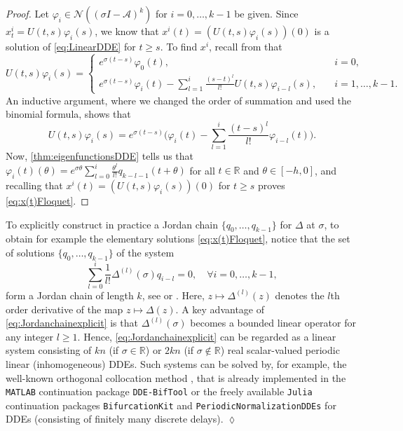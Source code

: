 \documentclass[english]{myarticle}
\begin{document}
\begin{sloppypar}
\begin{proof}
Let $\varphi_i \in \mathcal{N}((\sigma I - \mathcal{A})^k)$ for $i=0,\dots,k-1$ be given. Since $x_t^i = U(t,s)\varphi_i(s)$, we know that $x^i(t) = (U(t,s)\varphi_i(s))(0)$ is a solution of \eqref{eq:LinearDDE} for $t \geq s$. To find $x^i$, recall from \cite[Theorem 5]{Article2} that
\begin{equation*}
    U(t,s)\varphi_i(s) = 
    \begin{cases}
        e^{\sigma (t-s)} \varphi_0(t), \quad  &i=0, \\
        e^{\sigma (t-s)} \varphi_i(t) - \sum_{l=1}^{i}\frac{(s-t)^l}{l!}U(t,s)\varphi_{i-l}(s), \quad &i=1,\dots,k-1.
    \end{cases}
\end{equation*}
An inductive argument, where we changed the order of summation and used the binomial formula, shows that
\begin{equation*}
    U(t,s)\varphi_i(s) = e^{\sigma (t-s)} \bigg(\varphi_i(t) - \sum_{l=1}^{i} \frac{(t-s)^{l}}{l!}\varphi_{i-l}(t) \bigg).
\end{equation*}
Now, \cref{thm:eigenfunctionsDDE} tells us that $\varphi_i(t)(\theta) = e^{\sigma \theta} \sum_{l=0}^{i} \frac{\theta^l}{l!} q_{k-l-1}(t+\theta)$ for all $t \in \mathbb{R}$ and $\theta \in [-h,0]$, and recalling that $x^i(t) = (U(t,s)\varphi_i(s))(0)$ for $t \geq s$ proves \eqref{eq:x(t)Floquet}.
\end{proof}

\begin{remark} \label{remark:jordanchainpractice}
To explicitly construct in practice a Jordan chain $\{{q}_{0},\dots,{q}_{k-1} \}$ for $\Delta$ at $\sigma$, to obtain for example the elementary solutions \eqref{eq:x(t)Floquet}, notice that the set of solutions $\{q_0,\dots,q_{k-1}\}$ of the system
\begin{equation} \label{eq:Jordanchainexplicit}
    \sum_{l=0}^i \frac{1}{l!}\Delta^{(l)}(\sigma)  q_{i-l} = 0, \quad \forall i=0,\dots,k-1,
\end{equation}
form a Jordan chain of length $k$, see \cite[Section 7.4]{Hale1993} or \cite[Section IV.5]{Diekmann1995}. Here, $z \mapsto \Delta^{(l)} (z)$ denotes the $l$th order derivative of the map $z \mapsto \Delta(z)$. A key advantage of \eqref{eq:Jordanchainexplicit} is that $\Delta^{(l)}(\sigma)$ becomes a bounded linear operator for any integer $l \geq 1$. Hence, \eqref{eq:Jordanchainexplicit} can be regarded as a linear system consisting of $kn$ (if $\sigma \in \mathbb{R}$) or $2kn$ (if $\sigma \notin \mathbb{R}$) real scalar-valued periodic linear (inhomogeneous) DDEs. Such systems can be solved by, for example, the well-known orthogonal collocation method \cite{Engelborghs2002a,Engelborghs2001}, that is already implemented in the \verb|MATLAB| continuation package \verb|DDE-BifTool| \cite{Engelborghs2002,Sieber2014} or the freely available \verb|Julia| continuation packages \verb|BifurcationKit| \cite{Veltz2020} and \verb|PeriodicNormalizationDDEs| \cite{Bosschaert2024c} for DDEs (consisting of finitely many discrete delays). \hfill $\lozenge$ 
\end{remark}


\end{sloppypar}
\end{document}
